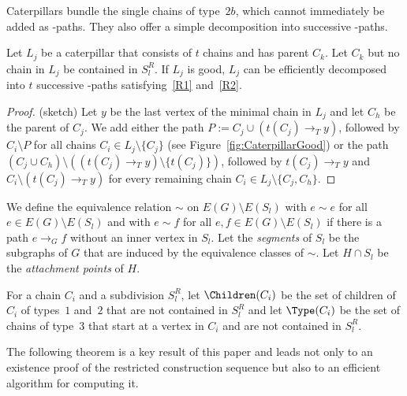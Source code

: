 Caterpillars bundle the single chains of type~$2b$, which cannot immediately be added as \BG-paths. They also offer a simple decomposition into successive \BG-paths.

\begin{lemma}\label{AddCaterpillar}
Let $L_j$ be a caterpillar that consists of $t$ chains and has parent $C_k$. Let $C_k$ but no chain in $L_j$ be contained in $S^R_l$. If $L_j$ is good, $L_j$ can be efficiently decomposed into $t$ successive \BG-paths satisfying~\ref{R1} and~\ref{R2}.
\end{lemma}
\begin{proof} (sketch) Let $y$ be the last vertex of the minimal chain in $L_j$ and let $C_h$ be the parent of $C_j$. We add either the path $P := C_j \cup (t(C_j) \rightarrow_T y)$, followed by $C_i \setminus P$ for all chains $C_i \in L_j \setminus \{C_j\}$ (see Figure~\ref{fig:CaterpillarGood}) or the path $(C_j \cup C_h) \setminus ((t(C_j) \rightarrow_T y) \setminus \{t(C_j)\})$, followed by $t(C_j) \rightarrow_T y$ and $C_i \setminus (t(C_j) \rightarrow_T y)$ for every remaining chain $C_i \in L_j \setminus \{C_j,C_h\}$.
\end{proof}






\begin{definition}\label{segment}
We define the equivalence relation $\sim$ on $E(G) \setminus E(S_l)$ with $e \sim e$ for all $e \in E(G) \setminus E(S_l)$ and with $e \sim f$ for all $e, f \in E(G) \setminus E(S_l)$ if there is a path $e \rightarrow_G f$ without an inner vertex in $S_l$.
Let the \emph{segments} of $S_l$ be the subgraphs of $G$ that are induced by the equivalence classes of $\sim$. Let $H \cap S_l$ be the \emph{attachment points} of $H$.
\end{definition}



\begin{definition}
For a chain $C_i$ and a subdivision $S^R_l$, let $\Children(C_i)$ be the set of children of $C_i$ of types~$1$ and~$2$ that are not contained in $S^R_l$ and let $\Type(C_i)$ be the set of chains of type~$3$ that start at a vertex in $C_i$ and are not contained in $S^R_l$.
\end{definition}

The following theorem is a key result of this paper and leads not only to an existence proof of the restricted construction sequence but also to an efficient algorithm for computing it.

